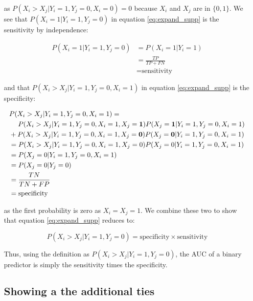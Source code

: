 \documentclass[12pt]{article}
\begin{document}
as \(P(X_{i} > X_{j} | Y_{i} = 1, Y_{j} = 0, X_{i} = 0) = 0\) because
\(X_{i}\) and \(X_{j}\) are in \(\{0, 1\}\). We see that
\(P(X_{i} = 1 | Y_{i} = 1, Y_{j} = 0)\) in equation
\eqref{eq:expand_supp} is the sensitivity by independence:

\begin{align*}
P(X_{i} = 1 | Y_{i} = 1, Y_{j} = 0) &= P(X_{i} = 1 | Y_{i} = 1) \\
&= \frac{TP}{TP + FN} \\
&= \text{sensitivity}
\end{align*}

and that \(P(X_{i} > X_{j} | Y_{i} = 1, Y_{j} = 0, X_{i} = 1)\) in
equation \eqref{eq:expand_supp} is the specificity:

\begin{align*}
& P(X_{i} > X_{j} | Y_{i} = 1, Y_{j} = 0, X_{i} = 1) =  \\
& \hspace{1.3em}P(X_{i} > X_{j} | Y_{i} = 1, Y_{j} = 0, X_{i} = 1, X_{j} = {\bf 1}) P(X_{j} = {\bf 1} | Y_{i} = 1, Y_{j} = 0, X_{i} = 1) \\
&+ P(X_{i} > X_{j} | Y_{i} = 1, Y_{j} = 0, X_{i} = 1, X_{j} = {\bf 0}) P(X_{j} = {\bf 0} | Y_{i} = 1, Y_{j} = 0, X_{i} = 1) \\
&= P(X_{i} > X_{j} | Y_{i} = 1, Y_{j} = 0, X_{i} = 1, X_{j} = 0) P(X_{j} = 0 | Y_{i} = 1, Y_{j} = 0, X_{i} = 1) \\
&= P(X_{j} = 0 | Y_{i} = 1, Y_{j} = 0, X_{i} = 1) \\
&= P(X_{j} = 0 | Y_{j} = 0)\\
&= \frac{TN}{TN + FP} \\
&= \text{specificity}
\end{align*}

as the first probability is zero as \(X_{i} = X_{j} = 1\). We combine
these two to show that equation \eqref{eq:expand_supp} reduces to:

\[
P(X_{i} > X_{j} | Y_{i} = 1, Y_{j} = 0) = \text{specificity} \times \text{sensitivity}
\]

Thus, using the definition as
\(P(X_{i} > X_{j} | Y_{i} = 1, Y_{j} = 0)\), the AUC of a binary
predictor is simply the sensitivity times the specificity.

\hypertarget{showing-a-the-additional-ties}{%
\subsection{Showing a the additional
ties}\label{showing-a-the-additional-ties}}
\end{document}
